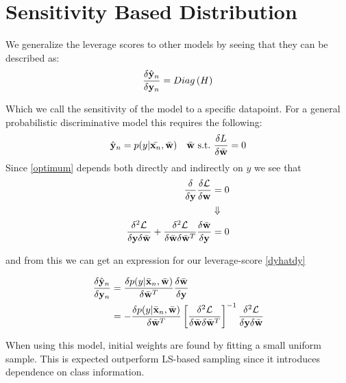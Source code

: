\documentclass{article}
\begin{document}
\section{Sensitivity Based Distribution}

We generalize the leverage scores to other models by seeing that they can be described as: 
	    \begin{equation}
	    \label{dyhatdy}
	    \frac{\delta \hat{{\bf y}}_n}{\delta {\bf y}_n} = Diag\left(H\right)
	    \end{equation}

Which we call the sensitivity of the model to a specific datapoint. For a general probabilistic discriminative model this requires the following:
    	\begin{equation}
    	 \hat{{\bf y}}_n = p(y|\bar{{\bf x}_n},\bar{{\bf w}}) \quad \bar{{\bf w}} \  \text{s.t.} \ \frac{\delta L}{\delta\bar{{\bf w}}}=0     	\label{optimum}
    	\end{equation}
Since \eqref{optimum} depends both directly and indirectly on $y$ we see that
    	\begin{align*}
    	\frac{\delta}{\delta {\bf y}} \frac{\delta \mathcal{L}}{\delta {\bf w}} &= 0 \\
    	&\Downarrow\\
    	\frac{\delta^2 \mathcal{L}}{\delta {\bf y} \delta \bar{{\bf w}}} + \frac{\delta^2 \mathcal{L}}{\delta \bar{{\bf w}} \delta \bar{{\bf w}}^T} \frac{\delta \bar{{\bf w}}}{\delta {\bf y}}&= 0
    	\end{align*}
    	
    	and from this we can get an expression for our leverage-score \eqref{dyhatdy}
    	
    	\begin{align}
    		\frac{\delta \hat{{\bf y}}_n}{\delta {\bf y}_n}&=\frac{\delta p(y|\bar{{\bf x}}_n,\bar{{\bf w}})}{\delta \bar{{\bf w}}^T} \frac{\delta \bar{{\bf w}}}{\delta {\bf y}} \nonumber \\
    		&= - \frac{\delta p(y|\bar{{\bf x}}_n,\bar{{\bf w}})}{\delta \bar{{\bf w}}^T} \left[ \frac{\delta^2 \mathcal{L}}{\delta \bar{{\bf w}} \delta \bar{{\bf w}}^T} \right]^{-1} \frac{\delta^2 \mathcal{L}}{\delta {\bf y} \delta \bar{{\bf w}}} \label{eq:sen}
    	\end{align}
    	
    	When using this model, initial weights are found by fitting a small uniform sample. This is expected outperform LS-based sampling since it introduces dependence on class information.
    	

\end{document}
